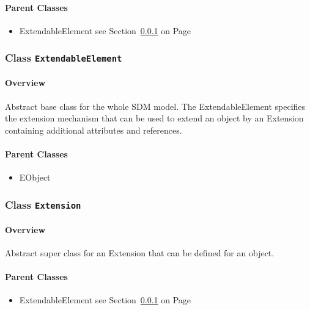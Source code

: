 \paragraph{Parent Classes}
\begin{itemize}
\item ExtendableElement see Section~\ref{cls:modeling::ExtendableElement} on Page~\pageref{cls:modeling::ExtendableElement}\end{itemize}
\subsubsection{\Large{Class \bfseries \texttt{ExtendableElement}\normalfont}}
\label{cls:modeling::ExtendableElement} 
\paragraph{Overview}

	
			
Abstract base class for the whole SDM model. The ExtendableElement specifies the extension mechanism that can be used to extend an object by an Extension containing additional attributes and references.	
		
	



\paragraph{Parent Classes}
\begin{itemize}
\item EObject\end{itemize}
\subsubsection{\Large{Class \bfseries \texttt{Extension}\normalfont}}
\label{cls:modeling::Extension} 
\paragraph{Overview}

	
			
Abstract super class for an Extension that can be defined for an object.	
		
	



\paragraph{Parent Classes}
\begin{itemize}
\item ExtendableElement see Section~\ref{cls:modeling::ExtendableElement} on Page~\pageref{cls:modeling::ExtendableElement}\end{itemize}
